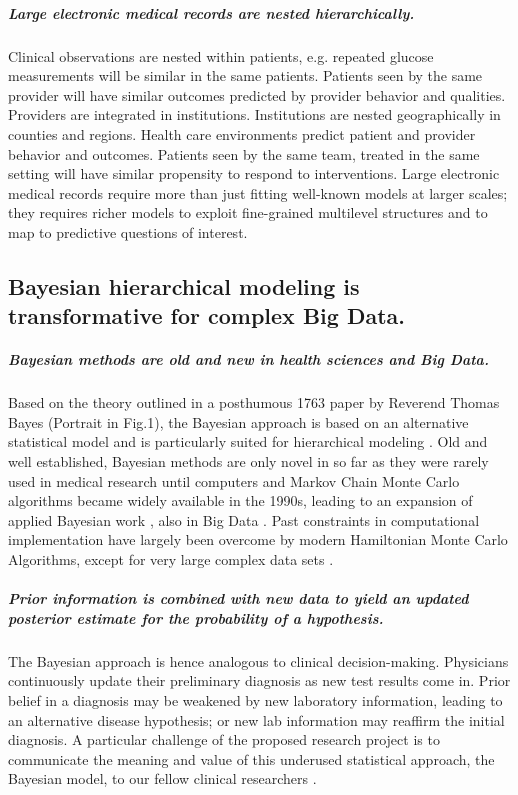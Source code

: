 \documentclass[11pt,notitlepage]{article}
\begin{document}
\subparagraph{Large electronic medical records are nested hierarchically.}
Clinical observations are nested within patients, e.g. repeated glucose measurements will be similar in the same patients. Patients seen by the same provider will have similar outcomes predicted by provider behavior and qualities. Providers are integrated in institutions. Institutions are nested geographically in counties and regions. Health care environments predict patient and provider behavior and outcomes. Patients seen by the same team, treated in the same setting will have similar propensity to respond to interventions. Large electronic medical records require more than just fitting well-known models at larger scales; they requires richer models to exploit fine-grained multilevel structures and to map to predictive questions of interest.


\subsection*{Bayesian hierarchical modeling is transformative for complex Big Data.}

\subparagraph*{Bayesian methods are old and new in health sciences and Big Data.}
Based on the theory outlined in a posthumous 1763 paper by Reverend Thomas Bayes (Portrait in Fig.1)\cite{Thomas_Bayes}, the Bayesian approach is based on an alternative statistical model and is particularly suited for hierarchical modeling \cite{Carlin_1349763,Sutton_2012}. Old and well established, Bayesian methods are only novel in so far as they were rarely used in medical research until computers and Markov Chain Monte Carlo algorithms became widely available in the 1990s, leading to an expansion of applied Bayesian work \cite{Ashby_16947924,Spiegelhalter_11134920}, also in Big Data \cite{Yoo_24987556}. Past constraints in computational implementation have largely been overcome by modern Hamiltonian Monte Carlo Algorithms, except for very large complex data sets \cite{Gelman-Hill_2014}. 

\subparagraph*{Prior information is combined with new data to yield an updated posterior estimate for the probability of a hypothesis.}
The Bayesian approach is hence analogous to clinical decision-making. Physicians continuously update their preliminary diagnosis as new test results come in. Prior belief in a diagnosis may be weakened by new laboratory information, leading to an alternative disease hypothesis; or new lab information may reaffirm the initial diagnosis. A particular challenge of the proposed research project is to communicate the meaning and value of this underused statistical approach, the Bayesian model, to our fellow clinical researchers \cite{Kruschke_22774788}.
\end{document}

